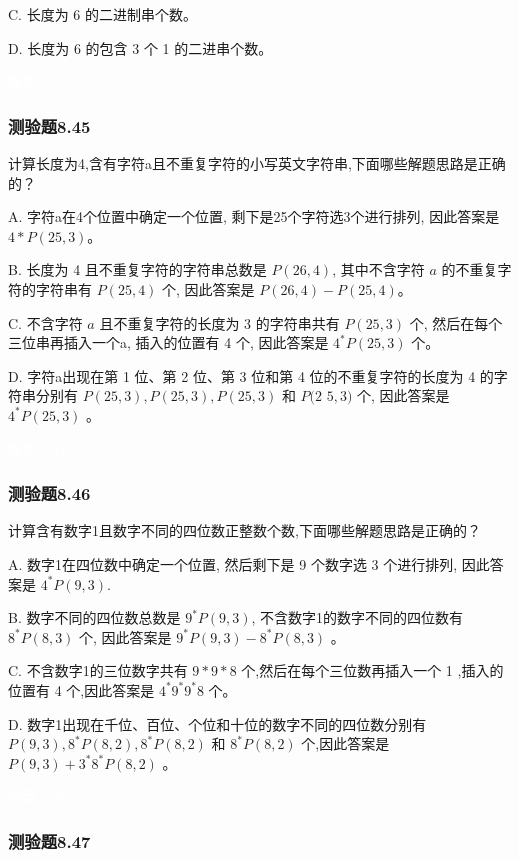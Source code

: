 \documentclass[UTF8, heading=true]{ctexart}
\begin{document}
C. 长度为 6 的二进制串个数。

D. 长度为 6 的包含 3 个 1 的二进串个数。

\textcolor{white}{答案：D}

\subsubsection{测验题8.45}

计算长度为4,含有字符a且不重复字符的小写英文字符串,下面哪些解题思路是正确的？

A. 字符a在4个位置中确定一个位置, 剩下是25个字符选3个进行排列, 因此答案是$4*P(25, 3)$。

B. 长度为 4 且不重复字符的字符串总数是 $P(26,4)$, 其中不含字符 $a$ 的不重复字符的字符串有 $P(25,4)$ 个, 因此答案是 $P(26, 4)-P(25,4)$。

C. 不含字符 $a$ 且不重复字符的长度为 3 的字符串共有 $P(25,3)$ 个, 然后在每个三位串再插入一个a, 插入的位置有 4 个, 因此答案是 $4^* P(25,3)$ 个。

D. 字符a出现在第 1 位、第 2 位、第 3 位和第 4 位的不重复字符的长度为 4 的字符串分别有 $P(25,3), P(25,3), P(25,3)$ 和 $P(2$ $5,3)$ 个, 因此答案是 $4^* P(25,3)$ 。


\textcolor{white}{答案：ABCD}

\subsubsection{测验题8.46}

计算含有数字1且数字不同的四位数正整数个数,下面哪些解题思路是正确的？

A. 数字1在四位数中确定一个位置, 然后剩下是 9 个数字选 3 个进行排列, 因此答案是 $4 ^* P(9,3)$.

B. 数字不同的四位数总数是 $9^* P(9,3)$, 不含数字1的数字不同的四位数有 $8^* P(8,3)$ 个, 因此答案是 $9 ^* P(9,3)-8^* P(8,3)$ 。

C. 不含数字1的三位数字共有 $9 * 9 * 8$ 个,然后在每个三位数再插入一个 1 ,插入的位置有 4 个,因此答案是 $4 ^* 9 ^* 9 ^* 8$ 个。

D. 数字1出现在千位、百位、个位和十位的数字不同的四位数分别有 $P(9,3), 8 ^* P(8,2), 8^* P(8,2)$ 和 $8 ^* P(8,2)$ 个,因此答案是 $P(9,3) + 3^* 8^* P(8,2)$ 。

\textcolor{white}{答案：BD}

\subsubsection{测验题8.47}
\end{document}
